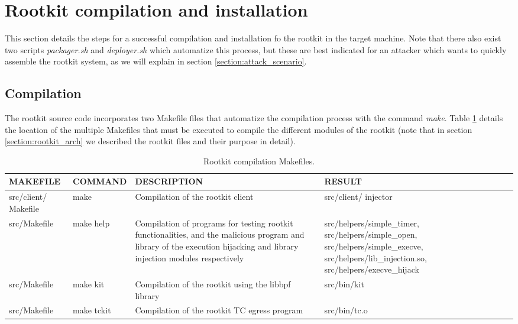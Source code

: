 \section{Rootkit compilation and installation} \label{section:compile_install}
This section details the steps for a successful compilation and installation fo the rootkit in the target machine. Note that there also exist two scripts \textit{packager.sh} and \textit{deployer.sh} which automatize this process, but these are best indicated for an attacker which wants to quickly assemble the rootkit system, as we will explain in section \ref{section:attack_scenario}.

\subsection{Compilation}
The rootkit source code incorporates two Makefile files that automatize the compilation process with the command \textit{make}. Table \ref{table:makefiles} details the location of the multiple Makefiles that must be executed to compile the different modules of the rootkit (note that in section \ref{section:rootkit_arch} we described the rootkit files and their purpose in detail).

\begin{table}[htbp]
\begin{tabular}{|>{\centering\arraybackslash}p{2.2cm}|>{\centering\arraybackslash}p{2.2cm}|>{\centering\arraybackslash}p{4cm}|>{\centering\arraybackslash}p{4.5cm}|}
\hline
\textbf{MAKEFILE} & \textbf{COMMAND} &\textbf{DESCRIPTION}&\textbf{RESULT}\\
\hline
\hline
src/client/ Makefile & make & Compilation of the rootkit client & src/client/ injector\\
\hline
src/Makefile & make help & Compilation of programs for testing rootkit functionalities, and the malicious program and library of the execution hijacking and library injection modules respectively & src/helpers/simple\_timer, src/helpers/simple\_open, src/helpers/simple\_execve, src/helpers/lib\_injection.so, src/helpers/execve\_hijack\\
\hline
src/Makefile & make kit & Compilation of the rootkit using the libbpf library & src/bin/kit\\
\hline
src/Makefile & make tckit & Compilation of the rootkit TC egress program & src/bin/tc.o\\
\hline
\end{tabular}
\caption{Rootkit compilation Makefiles.}
\label{table:makefiles}
\end{table}

